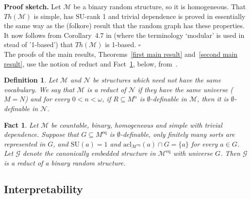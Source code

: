 \documentclass[11pt, twoside]{amsart}
\newtheorem{defin}[theor]{Definition}
\newtheorem{fact}[theor]{Fact}
\numberwithin{equation}{section}
\newcommand{\acl}{\mathrm{acl}}
\newcommand{\es}{\emptyset}
\newcommand{\su}{\mathrm{SU}}
\newcommand{\meq}{^{\mathrm{eq}}}
\newcommand{\mcG}{\mathcal{G}}
\newcommand{\mcM}{\mathcal{M}}
\newcommand{\mcN}{\mathcal{N}}
\begin{document}
\noindent
{\bf Proof sketch.}
Let $\mcM$ be a binary random structure, so it is homogeneous.
That $Th(\mcM)$ is simple, has $\su$-rank 1 and trivial dependence 
is proved in essentially the same way as the (folkore) result that the random graph has these properties.
It now follows from Corollary~4.7 in \cite{HKP} (where the terminology `modular'
is used in stead of '1-based') that $Th(\mcM)$ is 1-based.
\hfill $\square$
\\

\noindent
The proofs of the main results, Theorems~\ref{first main result} and~\ref{second main result}, 
use the notion of reduct and Fact~\ref{rank 1 sets are reducts of binary random structures}, below,
from~\cite{AK14}.

\begin{defin}\label{definition of reduct}{\rm
Let $\mcM$ and $\mcN$ be structures which need not have the same vocabulary.
We say that $\mcM$ is a {\em reduct} of $\mcN$ if they have the same universe ($M = N$) and
for every $0 < n < \omega$, if $R \subseteq M^n$ is $\es$-definable in $\mcM$, then it is $\es$-definable in $\mcN$.
}\end{defin}


\begin{fact}\label{rank 1 sets are reducts of binary random structures} {\rm \cite{AK14}}
Let $\mcM$ be countable, binary, homogeneous and simple with trivial dependence.
Suppose that $G \subseteq M\meq$ is $\es$-definable, only finitely many sorts are represented in $G$,
and $\su(a) = 1$ and $\acl_{\mcM\meq}(a) \cap G = \{a\}$ for every $a \in G$.
Let $\mcG$ denote the canonically embedded structure in $\mcM\meq$ with universe $G$.
Then $\mcG$ is a reduct of a binary random structure.
\end{fact}






\subsection{Interpretability}\label{Interpretability}
\end{document}
